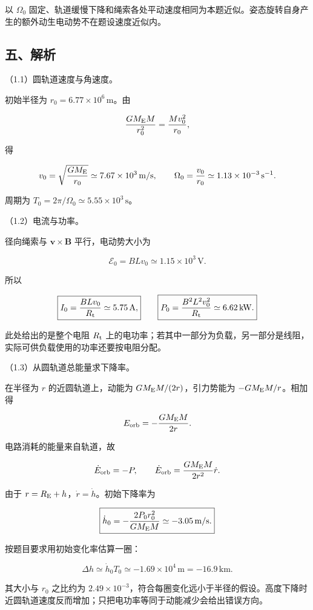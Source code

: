 \documentclass[12pt,a4paper,fontset=fandol]{ctexart}
\begin{document}
以 \(\Omega_0\)
固定、轨道缓慢下降和绳索各处平动速度相同为本题近似。姿态旋转自身产生的额外动生电动势不在题设速度近似内。

\subsection{五、解析}\label{ux4e94ux89e3ux6790-3}

（1.1）圆轨道速度与角速度。

初始半径为 \(r_0=6.77\times10^6\,\mathrm m\)。由

\[
\frac{GM_{\rm E}M}{r_0^2}=\frac{Mv_0^2}{r_0},
\]

得

\[
v_0=\sqrt{\frac{GM_{\rm E}}{r_0}}
\simeq7.67\times10^3\,\mathrm{m/s},\qquad
\Omega_0=\frac{v_0}{r_0}
\simeq1.13\times10^{-3}\,\mathrm{s^{-1}}.
\]

周期为 \(T_0=2\pi/\Omega_0\simeq5.55\times10^3\,\mathrm s\)。

（1.2）电流与功率。

径向绳索与 \(\boldsymbol v\times\boldsymbol B\) 平行，电动势大小为

\[
\mathcal E_0=BLv_0\simeq1.15\times10^3\,\mathrm V.
\]

所以

\[
\boxed{I_0=\frac{BLv_0}{R_{\rm t}}\simeq5.75\,\mathrm A,}
\qquad
\boxed{P_0=\frac{B^2L^2v_0^2}{R_{\rm t}}\simeq6.62\,\mathrm{kW}.}
\]

此处给出的是整个电阻 \(R_{\rm t}\)
上的电功率；若其中一部分为负载，另一部分是线阻，实际可供负载使用的功率还要按电阻分配。

（1.3）从圆轨道总能量求下降率。

在半径为 \(r\) 的近圆轨道上，动能为 \(GM_{\rm E}M/(2r)\)，引力势能为
\(-GM_{\rm E}M/r\)。相加得

\[
E_{\rm orb}=-\frac{GM_{\rm E}M}{2r}.
\]

电路消耗的能量来自轨道，故

\[
\dot E_{\rm orb}=-P,\qquad
\dot E_{\rm orb}=\frac{GM_{\rm E}M}{2r^2}\dot r.
\]

由于 \(r=R_{\rm E}+h\)，\(\dot r=\dot h\)。初始下降率为

\[
\boxed{\dot h_0=-\frac{2P_0r_0^2}{GM_{\rm E}M}
\simeq-3.05\,\mathrm{m/s}.}
\]

按题目要求用初始变化率估算一圈：

\[
\boxed{\Delta h\simeq\dot h_0T_0\simeq-1.69\times10^4\,\mathrm m
=-16.9\,\mathrm{km}.}
\]

其大小与 \(r_0\) 之比约为
\(2.49\times10^{-3}\)，符合每圈变化远小于半径的假设。高度下降时近圆轨道速度反而增加；只把电功率等同于动能减少会给出错误方向。
\end{document}
